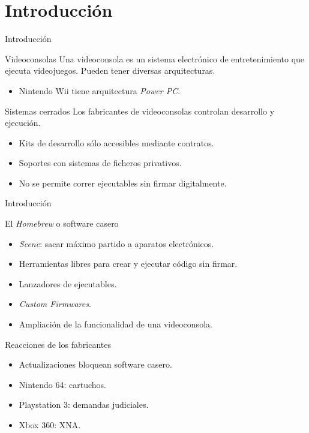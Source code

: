 

\section{Introducción}
\begin{frame}{Introducción}
	\begin{block}{Videoconsolas}
		\noindent Una videoconsola es un sistema electrónico de entretenimiento que ejecuta videojuegos. Pueden tener diversas arquitecturas.
		\begin{itemize}
			\item Nintendo Wii tiene arquitectura \textit{Power PC}.
		\end{itemize}
	\end{block}
	\pause
	\begin{block}{Sistemas cerrados}
	\noindent Los fabricantes de videoconsolas controlan desarrollo y ejecución.
	\begin{itemize}
		\item Kits de desarrollo sólo accesibles mediante contratos.
		\item Soportes con sistemas de ficheros privativos.
		\item No se permite correr ejecutables sin firmar digitalmente.
	\end{itemize}
	\end{block}
\end{frame}

\begin{frame}{Introducción}
	\begin{block}{El \textit{Homebrew} o software casero}
		\begin{itemize}
			\item \textit{Scene}: sacar máximo partido a aparatos electrónicos.
			\item Herramientas libres para crear y ejecutar código sin firmar.
			\item Lanzadores de ejecutables.
			\item \textit{Custom Firmwares}.
			\item Ampliación de la funcionalidad de una videoconsola.
		\end{itemize}
	\end{block}
	\pause
	\begin{block}{Reacciones de los fabricantes}
		\begin{itemize}
			\item Actualizaciones bloquean software casero.
			\item Nintendo 64: cartuchos.
			\item Playstation 3: demandas judiciales.
			\item Xbox 360: XNA.
		\end{itemize}
	\end{block}
\end{frame}

